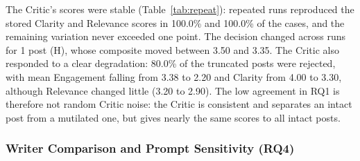 \documentclass[a4paper,twoside]{article}
\newcommand{\RepFlips}{1}
\newcommand{\RepEqualCla}{100.0\%}
\newcommand{\RepEqualRel}{100.0\%}
\newcommand{\TruncReject}{80.0\%}
\newcommand{\TruncMeanCla}{3.30}
\newcommand{\RepMeanCla}{4.00}
\newcommand{\TruncMeanRel}{2.90}
\newcommand{\RepMeanRel}{3.20}
\newcommand{\TruncMeanEng}{2.20}
\newcommand{\RepMeanEng}{3.38}
\begin{document}
The Critic's scores were stable (Table~\ref{tab:repeat}): repeated runs reproduced the stored Clarity and Relevance scores in \RepEqualCla{} and \RepEqualRel{} of the cases, and the remaining variation never exceeded one point. The decision changed across runs for \RepFlips{} post (H), whose composite moved between 3.50 and 3.35. The Critic also responded to a clear degradation: \TruncReject{} of the truncated posts were rejected, with mean Engagement falling from \RepMeanEng{} to \TruncMeanEng{} and Clarity from \RepMeanCla{} to \TruncMeanCla{}, although Relevance changed little (\RepMeanRel{} to \TruncMeanRel{}). The low agreement in RQ1 is therefore not random Critic noise: the Critic is consistent and separates an intact post from a mutilated one, but gives nearly the same scores to all intact posts.

\subsubsection{Writer Comparison and Prompt Sensitivity (RQ4)}
\end{document}
